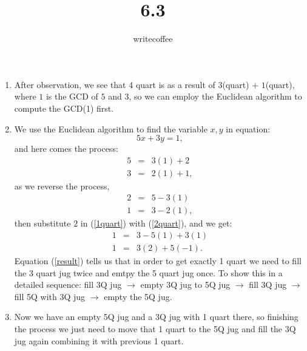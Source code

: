 \documentclass[11pt]{article}
\author{writecoffee}
\title{6.3}
\begin{document}
\maketitle

{\setlength{\baselineskip}{1\baselineskip}
\setlength{\parindent}{0pt}
\setlength{\parskip}{2ex plus 0.5ex minus 0.2ex}
\begin{enumerate}[1.]
\item
	After observation, we see that 4 quart is as a result of $3$(quart) + $1$(quart), where $1$ is the GCD of $5$ and $3$, %
	so we can employ the Euclidean algorithm to compute the GCD(1) first.
\item
	We use the Euclidean algorithm to find the variable $x, y$ in equation:
	\begin{equation}5x + 3y = 1,\end{equation}
	and here comes the process:
	\begin{eqnarray*}
	5 &=& 3(1) + 2\\
	3 &=& 2(1) + 1,
	\end{eqnarray*}
	as we reverse the process,
	\begin{eqnarray}
	\label{2quart}
	2 &=& 5 - 3(1)\\
	\label{1quart}
	1 &=& 3 - 2(1),
	\end{eqnarray}
	then substitute $2$ in (\ref{1quart}) with (\ref{2quart}), and we get:
	\begin{eqnarray}
	1 &=& 3 - 5(1) + 3(1)\\
	\label{result}
	1 &=& 3(2) + 5(-1).
	\end{eqnarray}
	Equation (\ref{result}) tells us that in order to get exactly 1 quart we need to fill the 3 quart jug twice and emtpy the 5 quart %
	jug once. To show this in a detailed sequence: fill 3Q jug $\to$ empty 3Q jug to 5Q jug $\to$ fill 3Q jug $\to$ fill 5Q with 3Q jug %
	$\to$ empty the 5Q jug.
\item
	Now we have an empty 5Q jug and a 3Q jug with 1 quart there, so finishing the process we just need to move that 1 quart %
	to the 5Q jug and fill the 3Q jug again combining it with previous 1 quart.
\end{enumerate}
\par}
\end{document}
